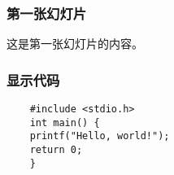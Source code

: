 \documentclass[UTF8]{ctexbeamer}
\begin{document}
\begin{frame}
    \frametitle{第一张幻灯片}
    这是第一张幻灯片的内容。
\end{frame}

\begin{frame}[fragile]
    \frametitle{显示代码}
    \begin{verbatim}
    #include <stdio.h>
    int main() {
    printf("Hello, world!");
    return 0;
    }
    \end{verbatim}
\end{frame}


\begin{columns}
\end{columns}
    
\end{document}
